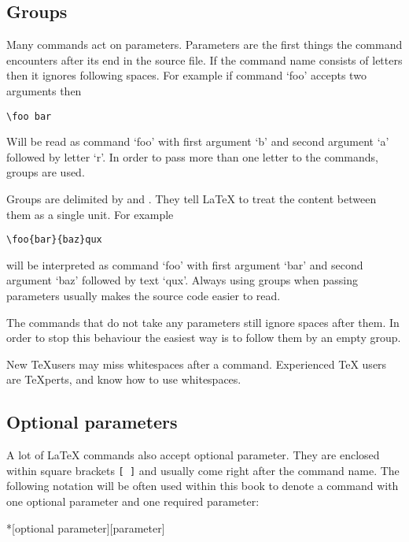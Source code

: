 \subsection{Groups}

Many commands act on parameters. Parameters are the first things the command
encounters after its end in the source file. If the command name consists of
letters then it ignores following spaces. For example if command \enquote*{foo}
accepts two arguments then
\begin{code}
  \verb+\foo bar+
\end{code}
Will be read as command \enquote*{foo} with first argument \enquote*{b} and
second argument \enquote*{a} followed by letter \enquote*{r}. In order to pass
more than one letter to the commands, groups are used.

Groups are delimited by \ai{\{} and \ai{\}}. They tell \LaTeX{} to treat the
content between them as a single unit. For example
\begin{code}
  \verb+\foo{bar}{baz}qux+
\end{code}
will be interpreted as command \enquote*{foo} with first argument
\enquote*{bar} and second argument \enquote*{baz} followed by text
\enquote*{qux}. Always using groups when passing parameters usually makes the
source code easier to read.

The commands that do not take any parameters still ignore spaces after them. In
order to stop this behaviour the easiest way is to follow them by an empty
group.

\begin{chktexignore}
  \begin{example}
New \TeX users may miss whitespaces
after a command. %
Experienced \TeX{} users are
\TeX perts, and know how to use
whitespaces. %
\end{example}
\end{chktexignore}

\subsection{Optional parameters}

A lot of \LaTeX{} commands also accept optional parameter. They are enclosed
within square brackets \verb|[ ]| and usually come right after the command
name. The following notation will be often used within this book to denote a
command with one optional parameter and one required parameter:
\begin{lscommand}
  *[optional parameter][parameter]
\end{lscommand}


